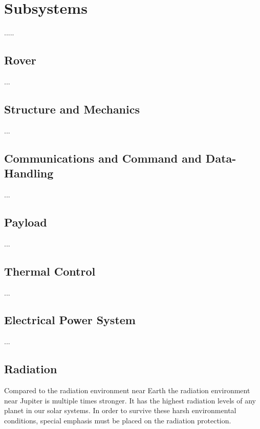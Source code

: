 \chapter{Subsystems}
\label{chap:subsystems}
.....



\section{Rover}
\label{sec:rover}
...
\section{Structure and Mechanics}
\label{sec:mechanics}
...
\section{Communications and Command and Data-Handling}
\label{sec:comm}
...
\section{Payload}
\label{sec:payload}
...
\section{Thermal Control}
\label{sec:thermalcontrol}
...
\section{Electrical Power System}
\label{sec:EPS}
...
\section{Radiation}
\label{sec:Radiation}

Compared to the radiation environment near Earth the radiation environment near Jupiter is multiple times stronger. It has the highest radiation levels of any planet in our solar systems. In order to survive these harsh environmental conditions, special emphasis must be placed on the radiation protection.